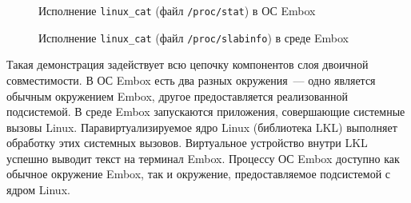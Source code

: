 \begin{figure}[H]
\caption{Исполнение \texttt{linux\_cat} (файл \texttt{/proc/stat}) в ОС Embox}
\label{fig:embox_cat_stat}
\end{figure}

\begin{figure}[H]
\caption{Исполнение \texttt{linux\_cat} (файл \texttt{/proc/slabinfo}) в среде Embox}
\label{fig:embox_cat_slabinfo}
\end{figure}

Такая демонстрация задействует всю цепочку компонентов слоя двоичной совместимости. В ОС Embox есть два разных окружения~--- одно является обычным окружением Embox, другое предоставляется реализованной подсистемой. В среде Embox запускаются приложения, совершающие системные вызовы Linux. Паравиртуализируемое ядро Linux (библиотека LKL) выполняет обработку этих системных вызовов. Виртуальное устройство внутри LKL успешно выводит текст на терминал Embox. Процессу ОС Embox доступно как обычное окружение Embox, так и окружение, предоставляемое подсистемой с ядром Linux.
